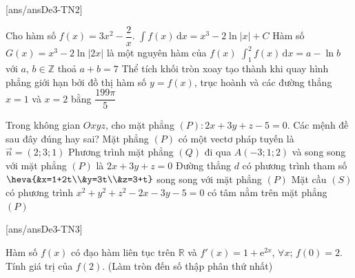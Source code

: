 \TNTF
{}[ans/ansDe3-TN2]
\begin{ex}
    Cho hàm số $f(x)=3x^2-\dfrac{2}{x}$.
    \choiceTF
    {\True $\displaystyle\int f(x) \mathrm{\,d}x= x^3-2\ln |x|+C$}
    {Hàm số $G(x)=x^3-2\ln|2x|$ là một nguyên hàm của $f(x)$}
    {\True $\displaystyle\int_{1}^{2} f(x) \mathrm{\,d}x=a-\ln b$ với $a$, $b \in \mathbb{Z}$ thoả $a+b=7$}
    {\True Thể tích khối tròn xoay tạo thành khi quay hình phẳng giới hạn bởi đồ thị hàm số $y=f(x)$, trục hoành và các đường thẳng $x=1$ và $x=2$ bằng $\dfrac{199\pi}{5}$}
\loigiai{ }
\end{ex}
\begin{ex}%
Trong không gian $O x y z$, cho mặt phẳng $(P)\colon 2 x+3 y+z-5=0$. Các mệnh đề sau đây đúng hay sai?
\choiceTF
{\True Mặt phẳng $(P)$ có một vectơ pháp tuyến là $\overrightarrow{n}=(2; 3; 1)$}
{Phương trình mặt phẳng $(Q)$ đi qua $A(-3;1;2)$ và song song với mặt phẳng $(P)$ là $2x+3y+z=0$}
{Đường thẳng $d$ có phương trình tham số $\heva{&x=1+2t\\&y=3t\\&z=3+t}$ song song với mặt phẳng $(P)$}
{Mặt cầu $(S)$ có phương trình $x^2+y^2+z^2-2x-3y-5=0$ có tâm nằm trên mặt phẳng $(P)$}
\loigiai{
}
\end{ex}

\TNSA
{}[ans/ansDe3-TN3]
\begin{ex}%
Hàm số $f(x)$ có đạo hàm liên tục trên $\mathbb{R}$ và $f'(x)=1+\mathrm{e}^{2x}$, $\forall x$; $f(0)=2$. Tính giá trị của $f(2)$. (Làm tròn đến số thập phân thứ nhất)
\end{ex}

